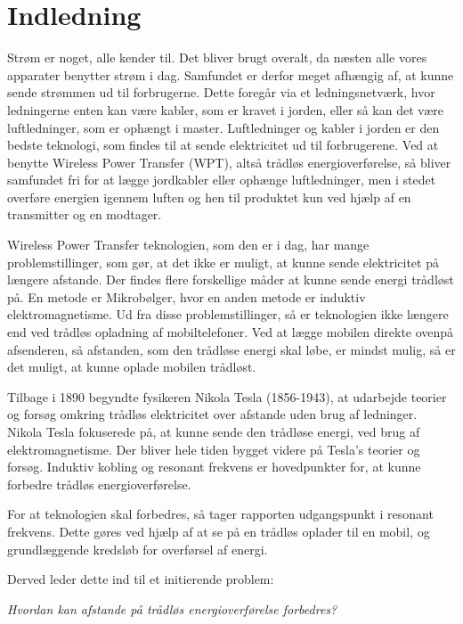 \chapter{Indledning}
Strøm er noget, alle kender til. Det bliver brugt overalt, da næsten alle vores apparater benytter strøm i dag. Samfundet er derfor meget afhængig af, at kunne sende strømmen ud til forbrugerne. Dette foregår via et ledningsnetværk, hvor ledningerne enten kan være kabler, som er kravet i jorden, eller så kan det være luftledninger, som er ophængt i master.\cite{elforsyning} Luftledninger og kabler i jorden er den bedste teknologi, som findes til at sende elektricitet ud til forbrugerene. Ved at benytte Wireless Power Transfer (WPT), altså trådløs energioverførelse, så bliver samfundet fri for at lægge jordkabler eller ophænge luftledninger, men i stedet overføre energien igennem luften og hen til produktet kun ved hjælp af en transmitter og en modtager.

Wireless Power Transfer teknologien, som den er i dag, har mange problemstillinger, som gør, at det ikke er muligt, at kunne sende elektricitet på længere afstande. Der findes flere forskellige måder at kunne sende energi trådløst på. En metode er Mikrobølger, hvor en anden metode er induktiv elektromagnetisme. Ud fra disse problemstillinger, så er teknologien ikke længere end ved trådløs opladning af mobiltelefoner. Ved at lægge mobilen direkte ovenpå afsenderen, så afstanden, som den trådløse energi skal løbe, er mindst mulig, så er det muligt, at kunne oplade mobilen trådløst.

Tilbage i 1890 begyndte fysikeren Nikola Tesla (1856-1943), at udarbejde teorier og forsøg omkring trådløs elektricitet over afstande uden brug af ledninger. Nikola Tesla fokuserede på, at kunne sende den trådløse energi, ved brug af elektromagnetisme. \cite{historie3} Der bliver hele tiden bygget videre på Tesla's teorier og forsøg. Induktiv kobling og resonant frekvens er hovedpunkter for, at kunne forbedre trådløs energioverførelse. \cite{mit}

For at teknologien skal forbedres, så tager rapporten udgangspunkt i resonant frekvens. Dette gøres ved hjælp af at se på en trådløs oplader til en mobil, og grundlæggende kredsløb for overførsel af energi.

Derved leder dette ind til et initierende problem:

\textit{Hvordan kan afstande på trådløs energioverførelse forbedres?}